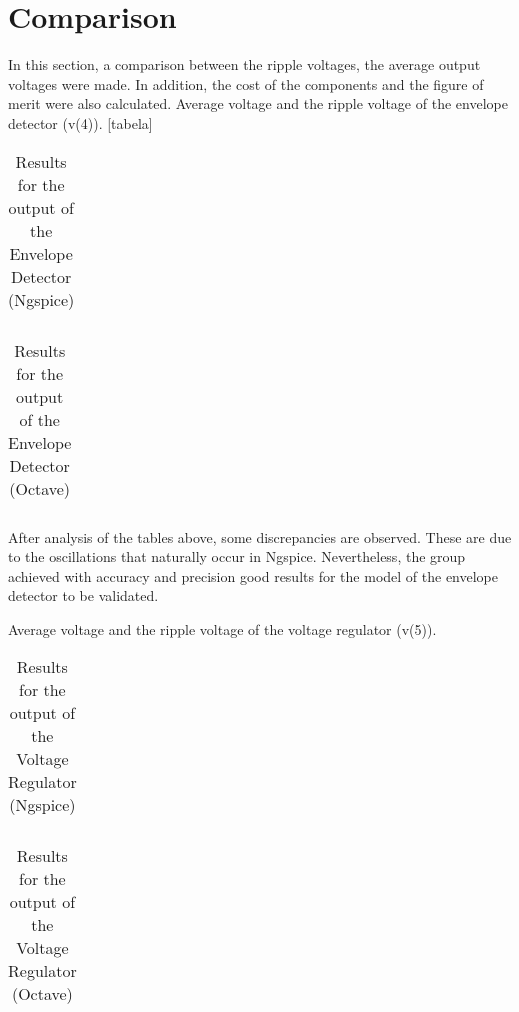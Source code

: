 \newpage
\section{Comparison}

In this section, a comparison between the ripple voltages, the average output voltages were made. In addition, the cost of the components and the figure of merit were also calculated.
Average voltage and the ripple voltage of the envelope detector (v(4)). [tabela]

\begin{table}[h]
\centering
\begin{tabularx}{0.6\textwidth} {
  | >{\raggedright\arraybackslash}X
  | >{\raggedleft\arraybackslash}X | }
 \hline

\end{tabularx}
\caption{Results for the output of the Envelope Detector (Ngspice)}
\end{table}

\begin{table}[!h]
\centering
\begin{tabularx}{0.6\textwidth} {
  | >{\raggedright\arraybackslash}X
  | >{\raggedleft\arraybackslash}X | }
 \hline

\end{tabularx}
\caption{Results for the output of the Envelope Detector (Octave)}
\end{table}


After analysis of the tables above, some discrepancies are observed. These are due to the oscillations that naturally occur in Ngspice. Nevertheless, the group achieved with accuracy and precision good results for the model of the envelope detector to be validated.


Average voltage and the ripple voltage of the voltage regulator (v(5)).
\begin{table}[h]
\centering
\begin{tabularx}{0.6\textwidth} {
  | >{\raggedright\arraybackslash}X
  | >{\raggedleft\arraybackslash}X | }
 \hline

\end{tabularx}
\caption{Results for the output of the Voltage Regulator (Ngspice)}
\end{table}

\begin{table}[H]
\centering
\begin{tabularx}{0.6\textwidth} {
  | >{\raggedright\arraybackslash}X
  | >{\raggedleft\arraybackslash}X | }
 \hline

\end{tabularx}
\caption{Results for the output of the Voltage Regulator (Octave)}
\end{table} 


